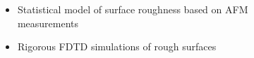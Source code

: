 \documentclass{beamer}
\begin{document}
\begin{frame}
\begin{columns}
\begin{column}{0.5\textwidth}
\begin{figure}[htb]
			\end{figure}
		\end{column}
		\begin{column}{0.5\textwidth}
			\begin{itemize}
				\item Statistical model of surface roughness based on AFM measurements\\
				\item Rigorous FDTD simulations of rough surfaces \\
			\end{itemize}
			
		\end{column}
	\end{columns}
	{\tiny \cite{Stolarek_2013}}
		
\end{frame}
\end{document}
